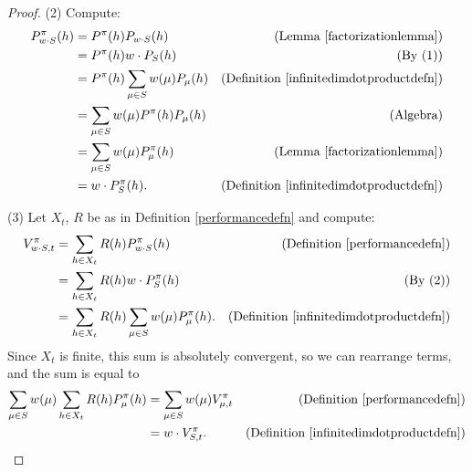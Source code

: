 \documentclass[twoside]{article}
\begin{document}
\begin{proof}
    (2) Compute:
    \begin{align*}
        P^\pi_{w\cdot S}(h)
            &= P^\pi(h) P_{w\cdot S}(h)
                &\mbox{(Lemma \ref{factorizationlemma})}\\
            &= P^\pi(h) w\cdot P_{S}(h)
                &\mbox{(By (1))}\\
            &= P^\pi(h) \sum_{\mu\in S}w(\mu)P_\mu(h)
                &\mbox{(Definition \ref{infinitedimdotproductdefn})}\\
            &= \sum_{\mu\in S}w(\mu)P^\pi(h)P_\mu(h)
                &\mbox{(Algebra)}\\
            &= \sum_{\mu\in S}w(\mu)P^\pi_\mu(h)
                &\mbox{(Lemma \ref{factorizationlemma})}\\
            &= w\cdot P^\pi_{S}(h).
                &\mbox{(Definition \ref{infinitedimdotproductdefn})}
    \end{align*}

    (3) Let $X_t$, $R$ be as in Definition \ref{performancedefn} and compute:
    \begin{align*}
        V^\pi_{w\cdot S,t}
            &= \sum_{h\in X_t}R(h)P^\pi_{w\cdot S}(h)
                &\mbox{(Definition \ref{performancedefn})}\\
            &= \sum_{h\in X_t}R(h)w\cdot P^\pi_{S}(h)
                &\mbox{(By (2))}\\
            &= \sum_{h\in X_t}R(h)\sum_{\mu\in S}w(\mu)P^\pi_\mu(h).
                &\mbox{(Definition \ref{infinitedimdotproductdefn})}
    \end{align*}
    Since $X_t$ is finite, this sum is absolutely convergent, so we can
    rearrange terms, and the sum is equal to
    \begin{align*}
        \sum_{\mu\in S}w(\mu)\sum_{h\in X_t}R(h)P^\pi_\mu(h)
            &= \sum_{\mu\in S}w(\mu)V^\pi_{\mu,t}
                &\mbox{(Definition \ref{performancedefn})}\\
            &= w\cdot V^\pi_{S,t}.
                &\mbox{(Definition \ref{infinitedimdotproductdefn})}
    \end{align*}
\end{proof}
\end{document}
